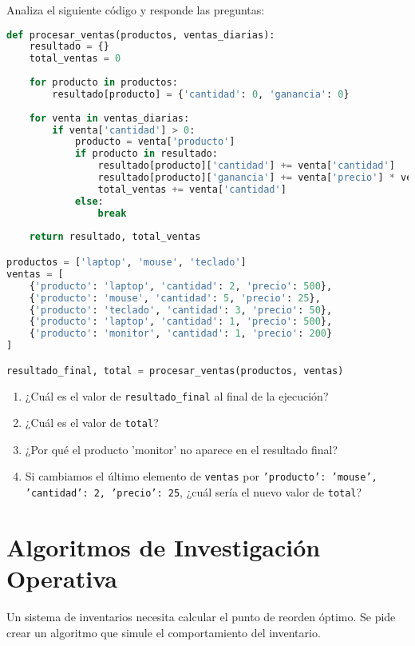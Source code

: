 \documentclass[12pt]{article}
\begin{document}
Analiza el siguiente código y responde las preguntas:
\begin{lstlisting}[language=Python]
def procesar_ventas(productos, ventas_diarias):
    resultado = {}
    total_ventas = 0
    
    for producto in productos:
        resultado[producto] = {'cantidad': 0, 'ganancia': 0}
    
    for venta in ventas_diarias:
        if venta['cantidad'] > 0:
            producto = venta['producto']
            if producto in resultado:
                resultado[producto]['cantidad'] += venta['cantidad']
                resultado[producto]['ganancia'] += venta['precio'] * venta['cantidad']
                total_ventas += venta['cantidad']
            else:
                break
    
    return resultado, total_ventas

productos = ['laptop', 'mouse', 'teclado']
ventas = [
    {'producto': 'laptop', 'cantidad': 2, 'precio': 500},
    {'producto': 'mouse', 'cantidad': 5, 'precio': 25},
    {'producto': 'teclado', 'cantidad': 3, 'precio': 50},
    {'producto': 'laptop', 'cantidad': 1, 'precio': 500},
    {'producto': 'monitor', 'cantidad': 1, 'precio': 200}
]

resultado_final, total = procesar_ventas(productos, ventas)
\end{lstlisting}

\begin{enumerate}[label=\alph*)]
    \item ¿Cuál es el valor de \texttt{resultado\_final} al final de la ejecución?
    \item ¿Cuál es el valor de \texttt{total}?
    \item ¿Por qué el producto 'monitor' no aparece en el resultado final?
    \item Si cambiamos el último elemento de \texttt{ventas} por \texttt{'producto': 'mouse', 'cantidad': 2, 'precio': 25}, ¿cuál sería el nuevo valor de \texttt{total}?
\end{enumerate}

\section{Algoritmos de Investigación Operativa}

Un sistema de inventarios necesita calcular el punto de reorden óptimo. Se pide crear un algoritmo que simule el comportamiento del inventario.
\end{document}
